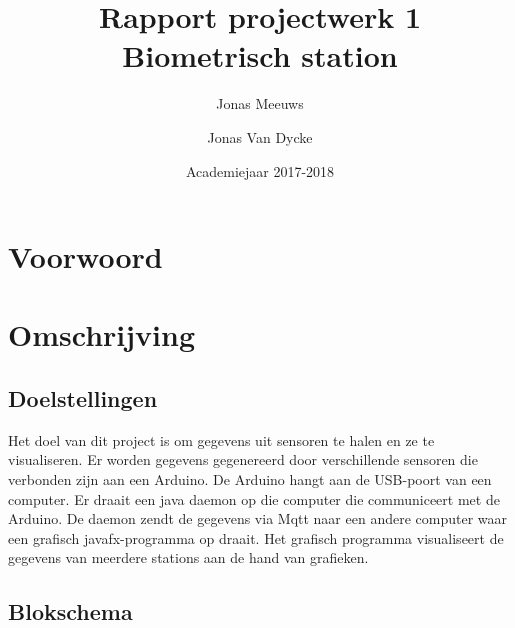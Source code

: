\documentclass[a4paper]{report}
\title{Rapport projectwerk 1\\ Biometrisch station}
\author{Jonas Meeuws \and Jonas Van Dycke}
\date{Academiejaar 2017-2018}
\begin{document}
\maketitle
\tableofcontents

\chapter{Voorwoord}

\chapter{Omschrijving}
    \section{Doelstellingen}
        Het doel van dit project is om gegevens uit sensoren te halen en ze te visualiseren.
        Er worden gegevens gegenereerd door verschillende sensoren die verbonden zijn aan een Arduino.
        De Arduino hangt aan de USB-poort van een computer.
        Er draait een java daemon op die computer die communiceert met de Arduino.
        De daemon zendt de gegevens via Mqtt naar een andere computer waar een grafisch javafx-programma op draait.
        Het grafisch programma visualiseert de gegevens van meerdere stations aan de hand van grafieken.

    \section{Blokschema}
        
\end{document}
